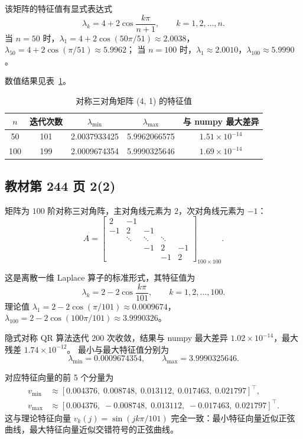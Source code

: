 \documentclass[10pt, a4paper]{article}
\begin{document}
该矩阵的特征值有显式表达式
\[
\lambda_k = 4 + 2\cos\frac{k\pi}{n+1}, \qquad k = 1, 2, \ldots, n.
\]
当 $n = 50$ 时，$\lambda_1 = 4 + 2\cos(50\pi/51) \approx 2.0038$，$\lambda_{50} = 4 + 2\cos(\pi/51) \approx 5.9962$；
当 $n = 100$ 时，$\lambda_1 \approx 2.0010$，$\lambda_{100} \approx 5.9990$。

数值结果见表~\ref{tab:sym1}。

\begin{table}[H]
    \centering
    \caption{对称三对角矩阵 (4, 1) 的特征值}
    \label{tab:sym1}
    \begin{tabular}{ccccc}
        \toprule
        $n$ & 迭代次数 & $\lambda_{\min}$ & $\lambda_{\max}$ & 与 numpy 最大差异 \\
        \midrule
        50  & 101 & 2.0037933425 & 5.9962066575 & $1.51\times10^{-14}$ \\
        100 & 199 & 2.0009674354 & 5.9990325646 & $1.69\times10^{-14}$ \\
        \bottomrule
    \end{tabular}
\end{table}

\subsection{教材第 244 页 2(2)}

矩阵为 $100$ 阶对称三对角阵，主对角线元素为 $2$，次对角线元素为 $-1$：
\[
A = \begin{bmatrix}
2 & -1 & & & \\
-1 & 2 & -1 & & \\
& \ddots & \ddots & \ddots & \\
& & -1 & 2 & -1 \\
& & & -1 & 2
\end{bmatrix}_{100\times100}.
\]

这是离散一维 Laplace 算子的标准形式，其特征值为
\[
\lambda_k = 2 - 2\cos\frac{k\pi}{101}, \qquad k = 1, 2, \ldots, 100.
\]
理论值 $\lambda_1 = 2 - 2\cos(\pi/101) \approx 0.0009674$，$\lambda_{100} = 2 - 2\cos(100\pi/101) \approx 3.9990326$。

隐式对称 QR 算法迭代 200 次收敛，结果与 numpy 最大差异 $1.02\times10^{-14}$，最大残差 $1.74\times10^{-12}$。
最小与最大特征值分别为
\[
\lambda_{\min} = 0.0009674354, \qquad
\lambda_{\max} = 3.9990325646.
\]

对应特征向量的前 5 个分量为
\begin{align*}
v_{\min} &\approx [0.004376,\; 0.008748,\; 0.013112,\; 0.017463,\; 0.021797]^{\!\top}, \\
v_{\max} &\approx [0.004376,\; -0.008748,\; 0.013112,\; -0.017463,\; 0.021797]^{\!\top}.
\end{align*}
这与理论特征向量 $v_k(j) = \sin(jk\pi/101)$ 完全一致：最小特征向量近似正弦曲线，最大特征向量近似交错符号的正弦曲线。
\end{document}
